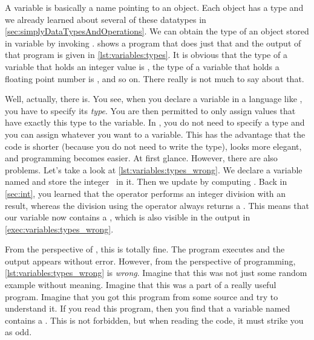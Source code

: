 %
\label{sec:variableTypesAndTypeHints}%
%
%
%
%
A variable is basically a name pointing to an object.
Each object has a type and we already learned about several of these datatypes in \cref{sec:simplyDataTypesAndOperations}.
We can obtain the type of an object stored in variable  by invoking .
 shows a program that does just that and the output of that program is given in \cref{lst:variables:types}.
It is obvious that the type of a variable that holds an integer value is , the type of a variable that holds a floating point number is , and so on.
There really is not much to say about that.%
\endhsection%
%
%
\label{sec:typesAndConfusion}%

Well, actually, there is.
You see, when you declare a variable in a language like , you have to specify its \emph{type}.
You are then permitted to only assign values that have exactly this type to the variable.
In \python, you do not need to specify a type and you can assign whatever you want to a variable.
This has the advantage that the code is shorter (because you do not need to write the type), looks more elegant, and programming becomes easier.
At first glance.
However, there are also problems.
Let's take a look at \cref{lst:variables:types_wrong}.
We declare a variable named  and store the integer~ in it.
Then we update  by computing .
Back in \cref{sec:int}, you learned that the \pythonilIdx{//} operator performs an integer division with an  result, whereas the division using the \pythonilIdx{/} operator always returns a .
This means that our variable  now contains a , which is also visible in the output in \cref{exec:variables:types_wrong}.

From the perspective of \python, this is totally fine.
The program executes and the output appears without error.
However, from the perspective of programming, \cref{lst:variables:types_wrong} is \emph{wrong}.
Imagine that this was not just some random example without meaning.
Imagine that this was a part of a really useful program.
Imagine that you got this program from some source and try to understand it.
If you read this program, then you find that a variable named  contains a .
This is not forbidden, but when reading the code, it must strike you as odd.

